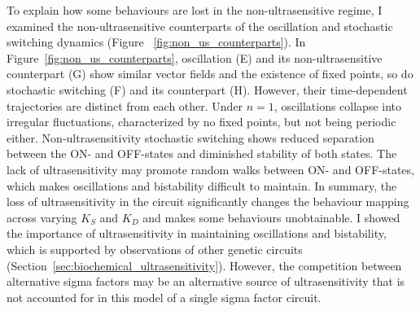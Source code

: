 To explain how some behaviours are lost in the non-ultrasensitive
regime, I examined the non-ultrasensitive counterparts of the
oscillation and stochastic switching dynamics (Figure~
\ref{fig:non_us_counterparts}).
In Figure~\ref{fig:non_us_counterparts},
oscillation (E) and its non-ultrasensitive counterpart (G)
show similar vector fields and the existence of fixed points,
so do stochastic switching (F) and its counterpart (H).
However, their time-dependent trajectories are distinct
from each other.
Under $n = 1$, oscillations collapse into irregular fluctuations,
characterized by no fixed points, but not being periodic either.
Non-ultrasensitivity stochastic switching shows reduced separation
between the ON- and OFF-states and diminished stability of both states.
The lack of ultrasensitivity may promote random walks between
ON- and OFF-states, which makes oscillations and bistability 
difficult to maintain.
In summary, the loss of ultrasensitivity in the circuit
significantly changes the behaviour mapping across
varying $K_S$ and $K_D$ and makes some behaviours unobtainable.
I showed the importance of ultrasensitivity in maintaining oscillations
and bistability, which is supported by observations of other
genetic circuits \cite{ferrell14c, gardner00c} 
(Section~\ref{sec:biochemical_ultrasensitivity}).
However, the competition between alternative sigma factors
may be an alternative source of ultrasensitivity that is not accounted 
for in this model of a single sigma factor circuit.

